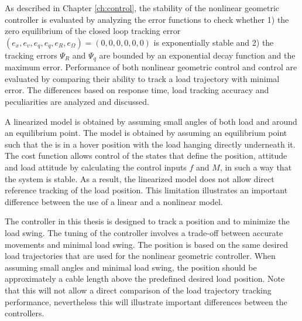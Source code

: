 As described in Chapter \ref{ch:control}, the stability of the nonlinear geometric controller is evaluated by analyzing the error functions to check whether 1) the zero equilibrium of the closed loop tracking error $(e_x,e_v,e_q,e_{\dot{q}},e_R,e_\Omega)=(0,0,0,0,0,0) $ is exponentially stable and 2) the tracking errors $ \Psi_R $ and $ \Psi_q $ are bounded by an exponential decay function and the maximum error.
Performance of both nonlinear geometric control and  control are evaluated by comparing their ability to track a load trajectory with minimal error. 
The differences based on response time, load tracking accuracy and peculiarities are analyzed and discussed.

A linearized model is obtained by assuming small angles of both load and  around an equilibrium point. 
The model is obtained by assuming an equilibrium point such that the  is in a hover position with the load hanging directly underneath it.
The  cost function allows control of the states that define the  position,  attitude and load attitude by calculating the control inputs $ f $ and $ M $, in such a way that the system is stable. 
As a result, the linearized model does not allow direct reference tracking of the load position. 
This limitation illustrates an important difference between the use of a linear and a nonlinear model. 

The  controller in this thesis is designed to track a  position and to minimize the load swing. 
The tuning of the  controller involves a trade-off between accurate  movements and minimal load swing. 
The  position is based on the same desired load trajectories that are used for the nonlinear geometric controller. 
When assuming small angles and minimal load swing, the  position should be approximately a cable length above the predefined desired load position. 
Note that this will not allow a direct comparison of the load trajectory tracking performance, nevertheless this will illustrate important differences between the controllers. 
%


